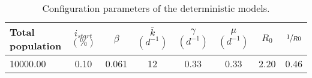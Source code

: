 \begin{table}[h]
\centering
\caption{Configuration parameters of the deterministic models.}
\label{tab:params}
\begin{tabular}{lccccccc}
\toprule
Total population & $i_{start}$ $(\%)$ & $\beta $  & $\bar{k} $ $(d^{-1})$ & $\gamma $ $(d^{-1})$ & $\mu$ $(d^{-1})$ & $R_0$ & $\sfrac{1}{R0}$\\
\midrule
10000.00 & 0.10 &   0.061 &  12 &   0.33 &   0.33 &  2.20 &  0.46\\
\bottomrule
\end{tabular}
\end{table}
